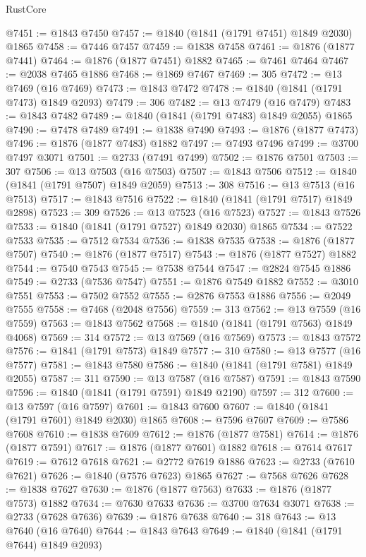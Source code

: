 \begin{lexlean}{RustCore}
\begin{coremodule}
@7451 := @1843 @7450
@7457 := @1840 (@1841 (@1791 @7451) @1849 @2030) @1865
@7458 := @7446 @7457
@7459 := @1838 @7458
@7461 := @1876 (@1877 @7441)
@7464 := @1876 (@1877 @7451) @1882
@7465 := @7461 @7464
@7467 := @2038 @7465 @1886
@7468 := @1869 @7467
@7469 := 305
@7472 := @13 @7469 (@16 @7469)
@7473 := @1843 @7472
@7478 := @1840 (@1841 (@1791 @7473) @1849 @2093)
@7479 := 306
@7482 := @13 @7479 (@16 @7479)
@7483 := @1843 @7482
@7489 := @1840 (@1841 (@1791 @7483) @1849 @2055) @1865
@7490 := @7478 @7489
@7491 := @1838 @7490
@7493 := @1876 (@1877 @7473)
@7496 := @1876 (@1877 @7483) @1882
@7497 := @7493 @7496
@7499 := @3700 @7497 @3071
@7501 := @2733 (@7491 @7499)
@7502 := @1876 @7501
@7503 := 307
@7506 := @13 @7503 (@16 @7503)
@7507 := @1843 @7506
@7512 := @1840 (@1841 (@1791 @7507) @1849 @2059)
@7513 := 308
@7516 := @13 @7513 (@16 @7513)
@7517 := @1843 @7516
@7522 := @1840 (@1841 (@1791 @7517) @1849 @2898)
@7523 := 309
@7526 := @13 @7523 (@16 @7523)
@7527 := @1843 @7526
@7533 := @1840 (@1841 (@1791 @7527) @1849 @2030) @1865
@7534 := @7522 @7533
@7535 := @7512 @7534
@7536 := @1838 @7535
@7538 := @1876 (@1877 @7507)
@7540 := @1876 (@1877 @7517)
@7543 := @1876 (@1877 @7527) @1882
@7544 := @7540 @7543
@7545 := @7538 @7544
@7547 := @2824 @7545 @1886
@7549 := @2733 (@7536 @7547)
@7551 := @1876 @7549 @1882
@7552 := @3010 @7551
@7553 := @7502 @7552
@7555 := @2876 @7553 @1886
@7556 := @2049 @7555
@7558 := @7468 (@2048 @7556)
@7559 := 313
@7562 := @13 @7559 (@16 @7559)
@7563 := @1843 @7562
@7568 := @1840 (@1841 (@1791 @7563) @1849 @4068)
@7569 := 314
@7572 := @13 @7569 (@16 @7569)
@7573 := @1843 @7572
@7576 := @1841 (@1791 @7573) @1849
@7577 := 310
@7580 := @13 @7577 (@16 @7577)
@7581 := @1843 @7580
@7586 := @1840 (@1841 (@1791 @7581) @1849 @2055)
@7587 := 311
@7590 := @13 @7587 (@16 @7587)
@7591 := @1843 @7590
@7596 := @1840 (@1841 (@1791 @7591) @1849 @2190)
@7597 := 312
@7600 := @13 @7597 (@16 @7597)
@7601 := @1843 @7600
@7607 := @1840 (@1841 (@1791 @7601) @1849 @2030) @1865
@7608 := @7596 @7607
@7609 := @7586 @7608
@7610 := @1838 @7609
@7612 := @1876 (@1877 @7581)
@7614 := @1876 (@1877 @7591)
@7617 := @1876 (@1877 @7601) @1882
@7618 := @7614 @7617
@7619 := @7612 @7618
@7621 := @2772 @7619 @1886
@7623 := @2733 (@7610 @7621)
@7626 := @1840 (@7576 @7623) @1865
@7627 := @7568 @7626
@7628 := @1838 @7627
@7630 := @1876 (@1877 @7563)
@7633 := @1876 (@1877 @7573) @1882
@7634 := @7630 @7633
@7636 := @3700 @7634 @3071
@7638 := @2733 (@7628 @7636)
@7639 := @1876 @7638
@7640 := 318
@7643 := @13 @7640 (@16 @7640)
@7644 := @1843 @7643
@7649 := @1840 (@1841 (@1791 @7644) @1849 @2093)

\end{coremodule}
\end{lexlean}
